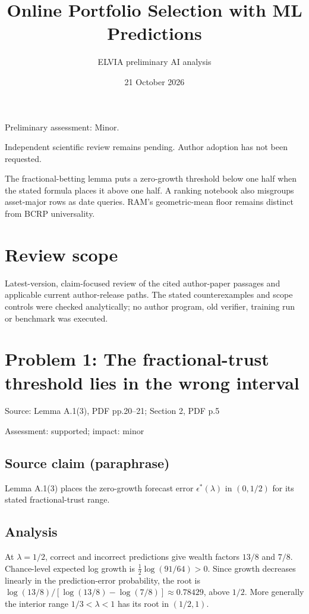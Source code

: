 \documentclass[11pt]{article}
\begin{document}
\title{Online Portfolio Selection with ML Predictions}

\author{ELVIA preliminary AI analysis}\date{21 October 2026}\maketitle

Preliminary assessment: Minor.\par

Independent scientific review remains pending. Author adoption has not been requested.

The fractional-betting lemma puts a zero-growth threshold below one half when the stated formula places it above one half. A ranking notebook also misgroups asset-major rows as date queries. RAM’s geometric-mean floor remains distinct from BCRP universality.

\section*{Review scope}

Latest-version, claim-focused review of the cited author-paper passages and applicable current author-release paths. The stated counterexamples and scope controls were checked analytically; no author program, old verifier, training run or benchmark was executed.

\section*{Problem 1: The fractional-trust threshold lies in the wrong interval}

Source: Lemma A.1(3), PDF pp.20–21; Section 2, PDF p.5

Assessment: supported; impact: minor

\subsection*{Source claim (paraphrase)}

Lemma A.1(3) places the zero-growth forecast error \(\epsilon^*(\lambda)\) in \((0,1/2)\) for its stated fractional-trust range.

\subsection*{Analysis}

At \(\lambda=1/2\), correct and incorrect predictions give wealth factors \(13/8\) and \(7/8\). Chance-level expected log growth is \(\tfrac12\log(91/64)>0\). Since growth decreases linearly in the prediction-error probability, the root is \(\log(13/8)/[\log(13/8)-\log(7/8)]\approx0.78429\), above \(1/2\). More generally the interior range \(1/3<\lambda<1\) has its root in \((1/2,1)\).
\end{document}
